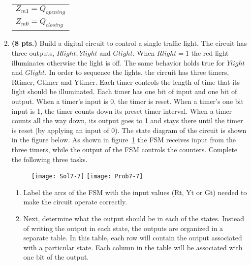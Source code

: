 \begin{enumerate}
\begin{onlysolution}
{\begin{itemize}
                        \begin{tabular}{l}
                            $Z_{m1} = Q_{opening}$ \\
                            $Z_{m0} = Q_{closing}$ \\
                        \end{tabular}
                \end{itemize}
            }
        \end{onlysolution}

    \item \textbf{ (8 pts.)}
        Build a digital circuit to control a single traffic light.  The circuit
        has three outputs, $Rlight, Ylight$ and $ Glight$.  When
        $Rlight=1$ the red light illuminates otherwise the light is off.
        The same behavior holds true for $Ylight$ and $Glight$.  In order
        to sequence the lights, the circuit has three timers, Rtimer, Gtimer and
        Ytimer.  Each timer controls the length of time that its light should be
        illuminated.  Each timer has one bit of input and one bit of output.  When a
        timer's input is 0, the timer is reset.  When a timer's one bit
        input is 1, the timer
        counts down its preset timer interval.  When a timer counts all the way down,
        its output goes to 1 and stays there until the timer is reset (by applying
        an input of 0).  The state diagram of the circuit is shown in the
        figure below.  As shown in figure~\ref{fig:TrafficFSM} the FSM receives input from the
        three timers, while the output of the FSM controls the counters. Complete
        the following three tasks.
        \begin{figure}[t]
            \ifshowanswers \texttt{[image: Sol7-7]}
            \else \texttt{[image: Prob7-7]} \fi
            \caption{}
            \label{fig:TrafficFSM}
        \end{figure}

        \begin{enumerate}
            \item Label the arcs of the FSM with the input values (Rt, Yt or Gt)
                needed to make the circuit operate correctly.

            \item Next, determine what the output should be in each
                of the states.  Instead of writing the output in each state, the
                outputs are organized in a separate table.  In this table, each
                row will contain the output associated with a particular state.
                Each column in the table will be associated with one bit of the output.


\end{enumerate}
\end{enumerate}
